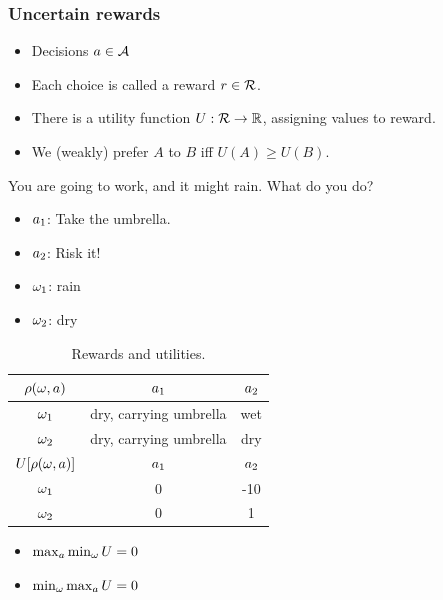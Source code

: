 \begin{frame}
  \frametitle{Uncertain rewards}
  \begin{itemize}
  \item Decisions $a \in \mathcal{A}$
  \item Each choice is called a \alert{reward} $r \in {\mathcal{R}}$.
  \item There is a \alert{utility function} $U : {\mathcal{R}} \to {\mathbb{R}}$, assigning values to reward.
  \item We (weakly) prefer $A$ to $B$ iff $U(A) \geq U(B)$.
  \end{itemize}

  \begin{example}%
    You are going to work, and it might rain.
    What do you do?
    \begin{itemize}
    \item $a_1$: Take the umbrella.
    \item $a_2$: Risk it!
    \item $\omega_1$: rain
    \item $\omega_2$: dry
    \end{itemize}
    \begin{table}
      \centering
      \begin{tabular}{c|c|c}
        $\rho(\omega,a)$ & $a_1$ & $a_2$ \\ %
        \hline
        $\omega_1$ & dry, carrying umbrella & wet\\
        $\omega_2$ & dry, carrying umbrella & dry\\
        \hline
        \hline
        $U[\rho(\omega,a)]$ & $a_1$ & $a_2$ \\
        \hline
        $\omega_1$ & 0 & -10\\
        $\omega_2$ & 0 & 1
      \end{tabular}
      \caption{Rewards and utilities.}
      \label{tab:rain-utility-function}
    \end{table}

    \begin{itemize}
    \item<2-> $\max_a \min_\omega U = 0$
    \item<3-> $\min_\omega \max_a  U = 0$
    \end{itemize}
  \end{example}
\end{frame}



